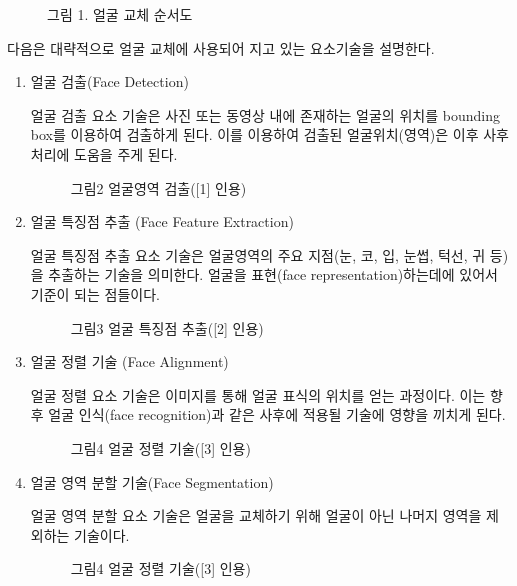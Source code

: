 \documentclass{oblivoir}
\begin{document}
\begin{figure}[h!]
    \centering
    \caption{그림 1. 얼굴 교체 순서도}
\end{figure}

다음은 대략적으로 얼굴 교체에 사용되어 지고 있는 요소기술을 설명한다.

                                
\begin{enumerate}[가.]
    \item  얼굴 검출(Face Detection)

 얼굴 검출 요소 기술은 사진 또는 동영상 내에 존재하는 얼굴의 위치를 bounding box를 이용하여 검출하게 된다. 이를 이용하여 검출된 얼굴위치(영역)은 이후 사후처리에 도움을 주게 된다.

 \begin{figure}[h!]
    \centering
    \caption{그림2  얼굴영역 검출([1] 인용)    }
\end{figure}
            
    \item 얼굴 특징점 추출 (Face Feature Extraction)

얼굴 특징점 추출 요소 기술은 얼굴영역의 주요 지점(눈, 코, 입, 눈썹, 턱선, 귀 등)을 추출하는 기술을 의미한다. 얼굴을 표현(face representation)하는데에 있어서 기준이 되는 점들이다.
\begin{figure}[h!]
    \centering
    \caption{그림3  얼굴 특징점 추출([2] 인용)}
\end{figure}
 
    \item 얼굴 정렬 기술 (Face Alignment)

얼굴 정렬 요소 기술은 이미지를 통해 얼굴 표식의 위치를 얻는 과정이다. 이는 향후 얼굴 인식(face recognition)과 같은 사후에 적용될 기술에 영향을 끼치게 된다.
\begin{figure}[h!]
    \centering
    \caption{그림4  얼굴 정렬 기술([3] 인용)}
\end{figure}

    \item 얼굴 영역 분할 기술(Face Segmentation)

얼굴 영역 분할 요소 기술은 얼굴을 교체하기 위해 얼굴이 아닌 나머지 영역을 제외하는 기술이다.

\begin{figure}[h!]
    \centering
    \caption{그림4  얼굴 정렬 기술([3] 인용)}
\end{figure}


\end{enumerate}
\end{document}
